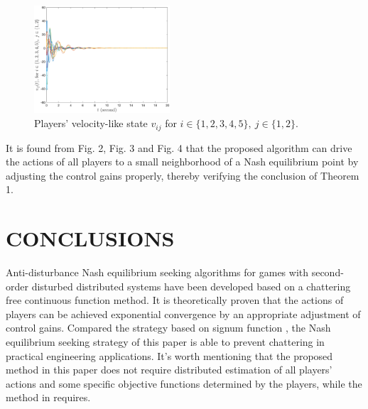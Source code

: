 \documentclass[lettersize,journal]{IEEEtran}
\begin{document}
\begin{figure}[htbp]
    \centering
    \includegraphics[width=0.45\textwidth]{img/vij.eps}
    \caption{Players' velocity-like state $v_{ij}$ for $i\in \{1,2,3,4,5\},~j\in \{1,2\}$.}
\end{figure}

It is found from Fig. 2, Fig. 3 and Fig. 4 that the proposed algorithm can drive the actions of all players to a small neighborhood of a Nash equilibrium point by adjusting the control gains properly, thereby verifying the conclusion of Theorem 1.

\section{CONCLUSIONS}
Anti-disturbance Nash equilibrium seeking algorithms for games with second-order disturbed distributed systems have been developed based on a chattering free continuous function method. It is theoretically proven that the actions of players can be achieved exponential convergence by an appropriate adjustment of control gains. Compared the strategy based on signum function \cite{9696299}, the Nash equilibrium seeking strategy of this paper is able to prevent chattering in practical engineering applications. It's worth mentioning that the proposed method in this paper does not require distributed estimation of all players' actions and some specific objective functions determined by the players, while the method in \cite{8985536} requires.

% 
% 
\end{document}
